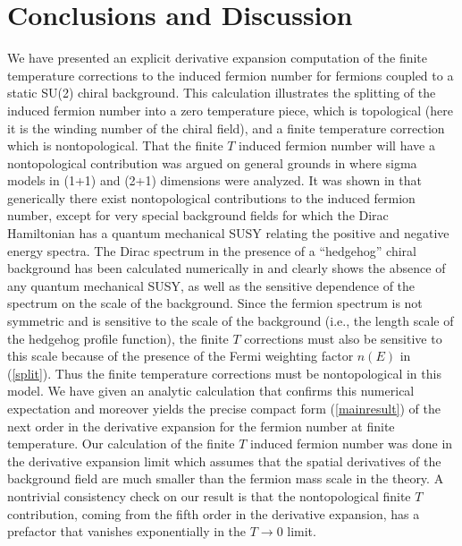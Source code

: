 \documentclass[a4paper,prd,showpacs,showkeys]{revtex4}
\begin{document}
{{\section{Conclusions and Discussion}
We have presented an explicit derivative expansion computation of the finite temperature corrections to the induced fermion number for fermions coupled to a static SU(2) chiral background. This calculation illustrates the splitting of the induced
fermion number into a zero temperature piece, which is topological (here it is the winding number of the chiral field), and a
finite temperature correction which is nontopological. That the finite
$T$ induced fermion  number will have a nontopological contribution
was argued on general grounds in \cite{fluc,nonlinearsigma}
where sigma models in (1+1) and (2+1) dimensions were analyzed. It was
shown in that generically there exist nontopological contributions to the induced
fermion number, except for very special background fields for which the Dirac Hamiltonian
has a quantum mechanical SUSY relating the positive and negative energy spectra.  The Dirac spectrum in the presence of a ``hedgehog''
chiral background has been calculated numerically in \cite{ripka,kahana} and clearly shows the absence of any quantum mechanical SUSY, as well as the sensitive dependence of the
spectrum on the scale of the background. Since the fermion spectrum is
not symmetric and is sensitive to the scale of the background (i.e., the length scale of the hedgehog profile function), the finite $T$ corrections must also be sensitive to this scale because
of the presence of the Fermi weighting factor $n(E)$ in
(\ref{split}). Thus the finite temperature corrections must be nontopological in this model. 
We have given an analytic calculation that confirms this numerical expectation and moreover yields the precise compact form (\ref{mainresult}) of the next order in the derivative expansion for the fermion number at finite temperature. 
Our calculation of the finite $T$ induced fermion
number was done in the derivative expansion limit which assumes that
the spatial derivatives of the background field are much smaller
than the fermion mass scale in the theory. A nontrivial consistency check on our result is that the nontopological finite $T$ contribution, coming from the fifth order in the derivative expansion, has a prefactor that vanishes exponentially in the $T \to 0$ limit.  

}}
\end{document}
